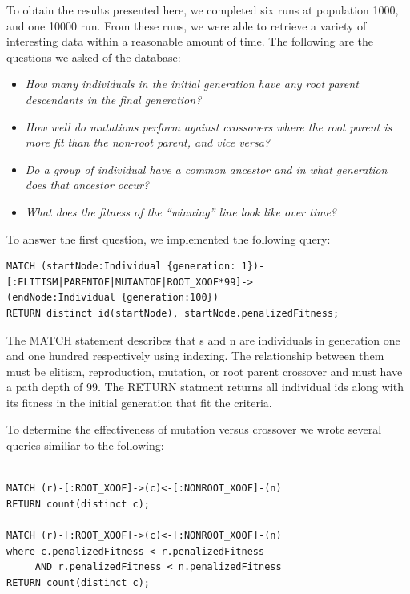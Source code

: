 \documentclass[12pt]{article}
\begin{document}
To obtain the results presented here, we completed six runs at population 1000, and one 10000 run. From these runs, we were able to retrieve a variety of interesting data within a reasonable amount of time. The following are the questions we asked of the database:
\begin{itemize}
\item \textit{How many individuals in the initial generation have any root parent descendants in the final generation?}
\item \textit{How well do mutations perform against crossovers where the root parent is more fit than the non-root parent, and vice versa?}
\item \textit{Do a group of individual have a common ancestor and in what generation does that ancestor occur?}
\item \textit{What does the fitness of the ``winning'' line look like over time?}

\end{itemize}

To answer the first question, we implemented the following query:

\begin{verbatim}
MATCH (startNode:Individual {generation: 1})-
[:ELITISM|PARENTOF|MUTANTOF|ROOT_XOOF*99]->
(endNode:Individual {generation:100})
RETURN distinct id(startNode), startNode.penalizedFitness;
\end{verbatim}

The MATCH statement describes that s and n are individuals in generation one and one hundred respectively using indexing. The relationship between them must be elitism, reproduction, mutation, or root parent crossover and must have a path depth of 99.
The RETURN statment returns all individual ids along with its fitness in the initial generation that fit the criteria.    

To determine the effectiveness of mutation versus crossover we wrote several queries similiar to the following:

\begin{verbatim}

MATCH (r)-[:ROOT_XOOF]->(c)<-[:NONROOT_XOOF]-(n)
RETURN count(distinct c);

MATCH (r)-[:ROOT_XOOF]->(c)<-[:NONROOT_XOOF]-(n)
where c.penalizedFitness < r.penalizedFitness 
     AND r.penalizedFitness < n.penalizedFitness
RETURN count(distinct c);

\end{verbatim}
\end{document}

